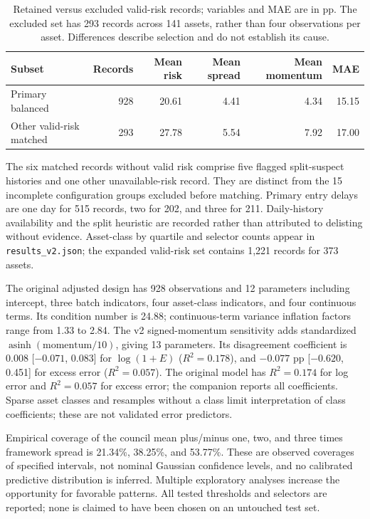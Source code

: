 \begin{table}[H]
\centering\small
\begin{tabular}{lrrrrr}
\toprule
Subset & Records & Mean risk & Mean spread & Mean momentum & MAE\\
\midrule
Primary balanced & 928 & 20.61 & 4.41 & 4.34 & 15.15\\
Other valid-risk matched & 293 & 27.78 & 5.54 & 7.92 & 17.00\\
\bottomrule
\end{tabular}
\caption{Retained versus excluded valid-risk records; variables and MAE are in pp. The excluded set has 293 records across 141 assets, rather than four observations per asset. Differences describe selection and do not establish its cause.}
\end{table}
The six matched records without valid risk comprise five flagged split-suspect histories and one other unavailable-risk record. They are distinct from the 15 incomplete configuration groups excluded before matching. Primary entry delays are one day for 515 records, two for 202, and three for 211. Daily-history availability and the split heuristic are recorded rather than attributed to delisting without evidence. Asset-class by quartile and selector counts appear in \texttt{results\_v2.json}; the expanded valid-risk set contains 1,221 records for 373 assets.

The original adjusted design has 928 observations and 12 parameters including intercept, three batch indicators, four asset-class indicators, and four continuous terms. Its condition number is 24.88; continuous-term variance inflation factors range from 1.33 to 2.84. The v2 signed-momentum sensitivity adds standardized $\operatorname{asinh}(\text{momentum}/10)$, giving 13 parameters. Its disagreement coefficient is 0.008 [$-0.071$, 0.083] for $\log(1+E)$ ($R^2=0.178$), and $-0.077$ pp [$-0.620$, 0.451] for excess error ($R^2=0.057$). The original model has $R^2=0.174$ for log error and $R^2=0.057$ for excess error; the companion reports all coefficients. Sparse asset classes and resamples without a class limit interpretation of class coefficients; these are not validated error predictors.

Empirical coverage of the council mean plus/minus one, two, and three times framework spread is 21.34\%, 38.25\%, and 53.77\%. These are observed coverages of specified intervals, not nominal Gaussian confidence levels, and no calibrated predictive distribution is inferred. Multiple exploratory analyses increase the opportunity for favorable patterns. All tested thresholds and selectors are reported; none is claimed to have been chosen on an untouched test set.

